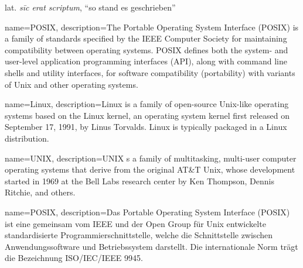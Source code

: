 	\else

		{lat. \textit{sīc erat scriptum}, \enquote{so stand es geschrieben}}

	\fi

	\newcommand{\sic}{\acrshort{sic}\ }



\fi

\ifenglish
	{%
		name={POSIX},
		description={The Portable Operating System Interface (POSIX) is a family of standards specified by the IEEE Computer Society for maintaining compatibility between operating systems. POSIX defines both the system- and user-level application programming interfaces (API), along with command line shells and utility interfaces, for software compatibility (portability) with variants of Unix and other operating systems.}
	}

	{%
		name={Linux},
		description={Linux is a family of open-source Unix-like operating systems based on the Linux kernel, an operating system kernel first released on September 17, 1991, by Linus Torvalds. Linux is typically packaged in a Linux distribution.}
	}

	{%
		name={UNIX},
		description={UNIX s a family of multitasking, multi-user computer operating systems that derive from the original AT&T Unix, whose development started in 1969 at the Bell Labs research center by Ken Thompson, Dennis Ritchie, and others.}
	}

\else

	{%
		name={POSIX},
		description={Das Portable Operating System Interface (POSIX) ist eine gemeinsam vom IEEE und der Open Group für Unix entwickelte standardisierte Programmierschnittstelle, welche die Schnittstelle zwischen Anwendungssoftware und Betriebssystem darstellt. Die internationale Norm trägt die Bezeichnung ISO/IEC/IEEE 9945. }
	}

\fi
